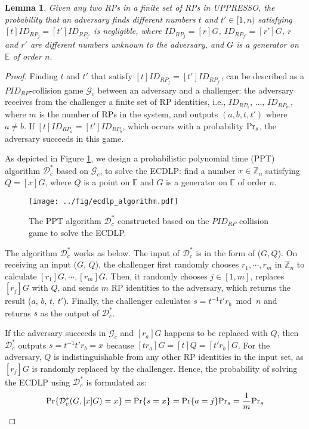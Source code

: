 \documentclass[letterpaper,onecolumn,10pt]{article}
\newtheorem{lemma}{Lemma}
\begin{document}
\begin{lemma}\label{lemma-rp}
  Given any two RPs in a finite set of RPs in UPPRESSO,
  the probability that an adversary finds different numbers $t$ and $t' \in [1,n)$ satisfying $[t]ID_{RP_j} = [t']ID_{RP_{j'}}$ is negligible, where $ID_{RP_j}=[r]G$, $ID_{RP_{j'}}=[r']G$, $r$ and $r'$ are different numbers unknown to the adversary, and $G$ is a generator on $\mathbb{E}$ of order $n$.
\end{lemma}
\begin{proof}
  Finding $t$ and $t'$ that satisfy $[t]ID_{RP_j} = [t']ID_{RP_{j'}}$, can be described as a $PID_{RP}$-collision game $\mathcal{G}_c$ between an adversary and a challenger: the adversary receives from the challenger a finite set of RP identities, i.e., $ID_{RP_1}$, ..., $ID_{RP_m}$, where $m$ is the number of RPs in the system, and outputs $(a, b, t, t')$ where $a \neq b$. If $[t]ID_{RP_a}=[t']ID_{RP_b}$, which occurs with a probability ${\rm Pr}_s$, the adversary succeeds in this game.
  
  As depicted in Figure \ref{fig:ecdlp_algorithm}, we design a probabilistic polynomial time (PPT) algorithm $\mathcal{D}^*_c$ based on $\mathcal{G}_c$, to solve the ECDLP: find a number $x \in \mathbb{Z}_n$ satisfying $Q = [x]G$, where $Q$ is a point on $\mathbb{E}$ and $G$ is a generator on $\mathbb{E}$ of order $n$.

  \begin{figure}[tb]
    \centering
    \texttt{[image: ../fig/ecdlp\_algorithm.pdf]}
    \caption{The PPT algorithm $\mathcal{D}^*_c$ constructed based on the $PID_{RP}$ collision game to solve the ECDLP.}
    \label{fig:ecdlp_algorithm}
  \end{figure}

  The algorithm $\mathcal{D}^*_c$ works as below.
  The input of $\mathcal{D}^*_c$ is in the form of ($G, Q$). On receiving an input ($G$, $Q$), the challenger first randomly chooses $r_1, \cdots, r_m$ in $\mathbb{Z}_n$ to calculate $[r_1]G, \cdots, [r_m]G$.
  Then, it randomly chooses $j \in [1,m]$, replaces $[r_j]G$ with $Q$, and sends $m$ RP identities to the adversary, which returns the result ($a$, $b$, $t$, $t'$). Finally, the challenger calculates $s = t^{-1}t'r_b \bmod n$ and returns $s$ as the output of $\mathcal{D}^*_c$.

  If the adversary succeeds in $\mathcal{G}_c$ and $[r_a]G$ happens to be replaced with $Q$, then $\mathcal{D}^*_c$ outputs $s=t^{-1}t'r_b =x$ because $[tr_a]G = [t]Q = [t'r_b]G$. For the adversary, $Q$ is indistinguishable from any other RP identities in the input set, as $[r_j]G$ is randomly replaced by the challenger.
  Hence, the probability of solving the ECDLP using $\mathcal{D}^*_c$ is formulated as:
  \begin{equation*}
    {\rm Pr}\{\mathcal{D}^*_c(G, [x]G)=x\} = {\rm Pr}\{s = x\}={\rm Pr}\{a=j\}{\rm Pr}_s=\frac{1}{m}{\rm Pr}_s
  \end{equation*}


\end{proof}
\end{document}
